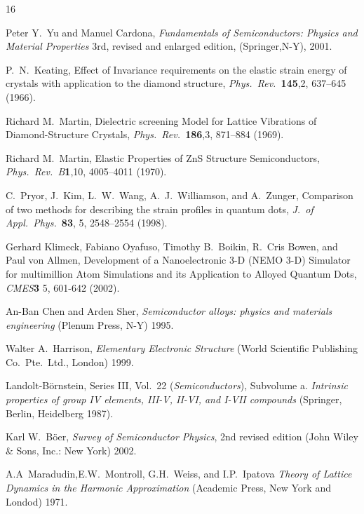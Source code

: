 \documentclass[12pt]{article}
\begin{document}
\begin{thebibliography}{16}

Peter Y.\ Yu and Manuel Cardona,
\emph{Fundamentals of Semiconductors: Physics and Material Properties} 
3rd, revised and enlarged edition, 
(Springer,N-Y), 2001.

P.\ N.\ Keating,
Effect of Invariance requirements on the elastic strain energy of
crystals with application to the diamond structure,
\emph{Phys.\ Rev.\ }{\bf 145},2, 637--645 (1966).

Richard M.\ Martin,
Dielectric screening Model for Lattice Vibrations of Diamond-Structure
Crystals,
\emph{Phys.\ Rev.\ }{\bf 186},3, 871--884 (1969).

Richard M.\ Martin,
Elastic Properties of ZnS Structure Semiconductors,
\emph{Phys.\ Rev.\ B}{\bf 1},10, 4005--4011 (1970).

C.\ Pryor, J.\ Kim, L.\ W.\ Wang, A.\ J.\ Williamson, and A.\ Zunger,
Comparison of two methods for describing the strain profiles in
quantum dots,
\emph{J.\ of Appl.\ Phys.\ }{\bf 83}, 5, 2548--2554 (1998).

Gerhard Klimeck, Fabiano Oyafuso, Timothy B.\ Boikin, R.\ Cris Bowen,
and Paul von Allmen,
Development of a Nanoelectronic 3-D (NEMO 3-D) Simulator for
multimillion Atom Simulations and its Application to Alloyed Quantum
Dots,
\emph{CMES}{\bf 3} 5, 601-642 (2002).

An-Ban Chen and Arden Sher,
\emph{Semiconductor alloys: physics and materials engineering}
(Plenum Press, N-Y) 1995.

Walter A.\ Harrison,
\emph{Elementary Electronic Structure}
(World Scientific Publishing Co.\ Pte.\ Ltd., London) 1999.

Landolt-B\"{o}rnstein, Series III, Vol.~22 ({\em Semiconductors\/}), Subvolume
a. \emph{Intrinsic properties of group IV elements, III-V, II-VI, and
  I-VII compounds} (Springer, Berlin, Heidelberg 1987).

Karl W.\ B\"{o}er,
\emph{Survey of Semiconductor Physics}, 2nd revised edition (John
Wiley \& Sons, Inc.: New York) 2002.

A.A~Maradudin,E.W.~Montroll, G.H.~Weiss, and I.P.~Ipatova
\emph{Theory of Lattice Dynamics in the Harmonic Approximation}
(Academic Press, New York and Londod) 1971.


\end{thebibliography}
\end{document}
